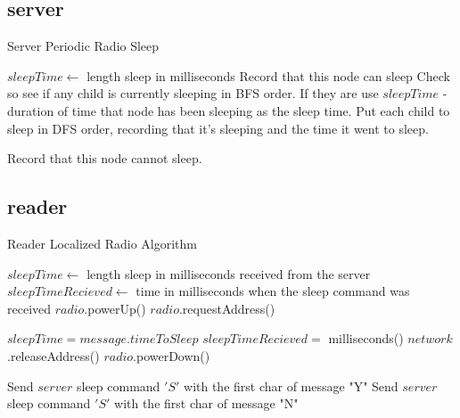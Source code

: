 \documentclass[12pt]{article}
\begin{document}
\subsection{server}
\begin{algorithm}
	\caption{Server Periodic Radio Sleep}
	\begin{algorithmic} 	
		\STATE $sleepTime \leftarrow$ length sleep in milliseconds
		\STATE Record that this node can sleep
		\STATE Check so see if any child is currently sleeping in BFS order. If they are use $sleepTime$ - duration of time that node has been sleeping as the sleep time.
		\STATE Put each child to sleep in DFS order, recording that it's sleeping and the time it went to sleep.
		\ENDIF
		\ENDIF
		
		\STATE Record that this node cannot sleep.
		\ENDIF
	
	\end{algorithmic}
\end{algorithm}

\subsection{reader}
\begin{algorithm}
	\caption{Reader Localized Radio Algorithm}
	\begin{algorithmic} 	
		\STATE $sleepTime \leftarrow$ length sleep in milliseconds received from the server 
		\STATE $sleepTimeRecieved \leftarrow$ time in milliseconds when the sleep command was received
		\STATE $radio$.powerUp()
		\STATE $radio$.requestAddress()
		\ENDIF
		
		\STATE $sleepTime = message.timeToSleep$
		\STATE $sleepTimeRecieved = $ milliseconds()
		\STATE $network$.releaseAddress()
		\STATE $radio$.powerDown()
		\ENDIF
		
		\STATE Send $server$ sleep command $'S'$ with the first char of message "Y"
		\ENDIF
		\ELSE
		\STATE Send $server$ sleep command $'S'$ with the first char of message "N"
		\ENDIF
		\ENDIF
		
		
	\end{algorithmic}
\end{algorithm}
\end{document}
